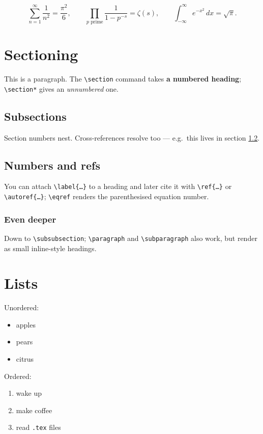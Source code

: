 \documentclass{article}
\begin{document}
\[
  \sum_{n=1}^{\infty} \frac{1}{n^2} = \frac{\pi^2}{6},
  \qquad
  \prod_{p \text{ prime}} \frac{1}{1 - p^{-s}} = \zeta(s),
  \qquad
  \int_{-\infty}^{\infty} e^{-x^2}\,dx = \sqrt{\pi}.
\]

\section{Sectioning}

This is a paragraph. The \texttt{\textbackslash section} command takes
\textbf{a numbered heading}; \texttt{\textbackslash section*} gives an
\textit{unnumbered} one.

\subsection{Subsections}

Section numbers nest. Cross-references resolve too --- e.g.\ this lives
in section \ref{sec:numbers}.

\subsection{Numbers and refs}\label{sec:numbers}

You can attach \texttt{\textbackslash label\{\dots\}} to a heading and
later cite it with \texttt{\textbackslash ref\{\dots\}} or
\texttt{\textbackslash autoref\{\dots\}}; \texttt{\textbackslash eqref}
renders the parenthesised equation number.

\subsubsection{Even deeper}

Down to \texttt{\textbackslash subsubsection};
\texttt{\textbackslash paragraph} and \texttt{\textbackslash subparagraph}
also work, but render as small inline-style headings.

\section{Lists}

Unordered:
\begin{itemize}
  \item apples
  \item pears
  \item citrus
\end{itemize}

Ordered:
\begin{enumerate}
  \item wake up
  \item make coffee
  \item read \texttt{.tex} files
\end{enumerate}
\end{document}
